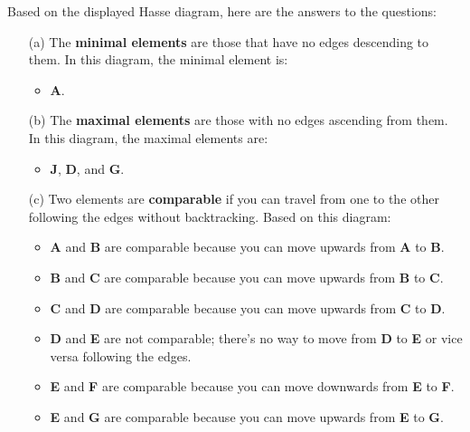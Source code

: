 
Based on the displayed Hasse diagram, here are the answers to the questions:

\begin{enumerate}
    \item[(a)] The \textbf{minimal elements} are those that have no edges descending to them. In this diagram, the minimal element is:
    \begin{itemize}
        \item \textbf{A}.
    \end{itemize}
    
    \item[(b)] The \textbf{maximal elements} are those with no edges ascending from them. In this diagram, the maximal elements are:
    \begin{itemize}
        \item \textbf{J}, \textbf{D}, and \textbf{G}.
    \end{itemize}
    
    \item[(c)] Two elements are \textbf{comparable} if you can travel from one to the other following the edges without backtracking. Based on this diagram:
    \begin{itemize}
        \item \textbf{A} and \textbf{B} are comparable because you can move upwards from \textbf{A} to \textbf{B}.
        \item \textbf{B} and \textbf{C} are comparable because you can move upwards from \textbf{B} to \textbf{C}.
        \item \textbf{C} and \textbf{D} are comparable because you can move upwards from \textbf{C} to \textbf{D}.
        \item \textbf{D} and \textbf{E} are not comparable; there's no way to move from \textbf{D} to \textbf{E} or vice versa following the edges.
        \item \textbf{E} and \textbf{F} are comparable because you can move downwards from \textbf{E} to \textbf{F}.
        \item \textbf{E} and \textbf{G} are comparable because you can move upwards from \textbf{E} to \textbf{G}.
    \end{itemize}
\end{enumerate}
